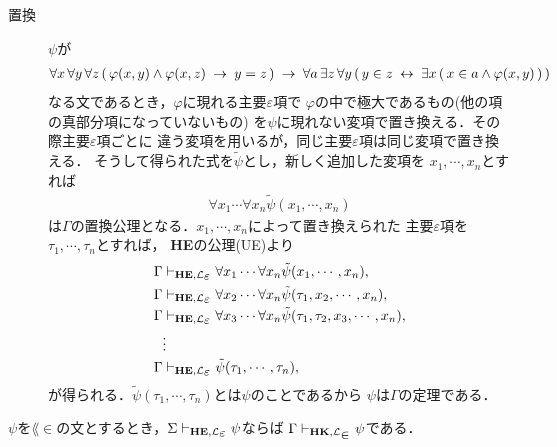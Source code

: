 \begin{sketch}
\begin{description}
			\item[置換] $\psi$が
				\begin{align}
					\forall x\, \forall y\, \forall z\, 
					(\, \varphi(x,y) \wedge \varphi(x,z)
					\hspace{0.25em}\rightarrow\hspace{0.25em} y = z\, )
					\hspace{0.25em}\rightarrow\hspace{0.25em} \forall a\, \exists z\, \forall y\,
					(\, y \in z \hspace{0.25em}\leftrightarrow\hspace{0.25em} \exists x\, (\, x \in a \wedge 
					\varphi(x,y)\, )\, )
				\end{align}
				なる文であるとき，$\varphi$に現れる主要$\varepsilon$項で
				$\varphi$の中で極大であるもの(他の項の真部分項になっていないもの)
				を$\psi$に現れない変項で置き換える．その際主要$\varepsilon$項ごとに
				違う変項を用いるが，同じ主要$\varepsilon$項は同じ変項で置き換える．
				そうして得られた式を$\tilde{\psi}$とし，新しく追加した変項を
				$x_{1},\cdots,x_{n}$とすれば
				\begin{align}
					\forall x_{1} \cdots \forall x_{n} \tilde{\psi}(x_{1},\cdots,x_{n})
				\end{align}
				は$\Gamma$の置換公理となる．$x_{1},\cdots,x_{n}$によって置き換えられた
				主要$\varepsilon$項を$\tau_{1},\cdots,\tau_{n}$とすれば，
				{\bf HE}の公理(UE)より
				\begin{align}
					\Gamma &\provable{\mbox{{\bf HE}},\lang{\varepsilon}} \forall x_{1} \cdots \forall x_{n} \tilde{\psi}(x_{1},\cdots,x_{n}), \\
					\Gamma &\provable{\mbox{{\bf HE}},\lang{\varepsilon}} \forall x_{2} \cdots \forall x_{n} \tilde{\psi}(\tau_{1},x_{2},\cdots,x_{n}), \\
					\Gamma &\provable{\mbox{{\bf HE}},\lang{\varepsilon}} \forall x_{3} \cdots \forall x_{n} \tilde{\psi}(\tau_{1},\tau_{2},x_{3},\cdots,x_{n}), \\
					&\vdots \\
					\Gamma &\provable{\mbox{{\bf HE}},\lang{\varepsilon}} \tilde{\psi}(\tau_{1},\cdots,\tau_{n}), \\
				\end{align}
				が得られる．$\tilde{\psi}(\tau_{1},\cdots,\tau_{n})$とは$\psi$のことであるから
				$\psi$は$\Gamma$の定理である．
				\QED
		\end{description}
	\end{sketch}
	
	\begin{screen}
		\begin{metathm}
		\label{metathm:Henkin_expansion_HE_to_HK}
			$\psi$を$\lang{\in}$の文とするとき，$\Sigma \provable{\mbox{{\bf HE}},\lang{\varepsilon}} \psi$ならば
			$\Gamma \provable{\mbox{{\bf HK}},\lang{\in}} \psi$である．
		\end{metathm}
	\end{screen}
	
